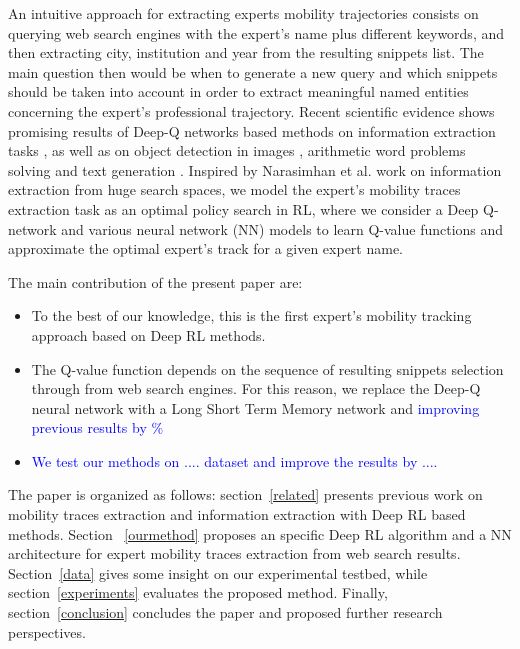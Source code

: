 \documentclass[11pt,a4paper]{article}
\newcommand{\PA}[1]{{\textcolor{blue}{#1}}}
\begin{document}
An intuitive approach for extracting experts mobility trajectories consists on querying web search engines with the expert's name plus different keywords, and then extracting city, institution and year from the resulting snippets list. The main question then would be when to generate a new query and which snippets should be taken into account in order to extract meaningful named entities concerning the expert's professional trajectory. Recent scientific evidence shows promising results of Deep-Q networks based methods on information extraction tasks \citep{narasimhan2016improving}, as well as on object detection in images \cite{Caicedo2015}, arithmetic word problems solving \cite{wang2018} and text generation \citep{Guo2015}. Inspired by Narasimhan et al.  work on information extraction from huge search spaces, we model the expert's mobility traces extraction task as an optimal policy search in RL, where we consider a Deep Q-network and various neural network (NN) models to learn Q-value functions and approximate the optimal expert's track for a given expert name.  

The main contribution of the present paper are:
\begin{itemize}
\item To the best of our knowledge, this is the first expert's mobility tracking approach based on  Deep RL methods. 
\item The Q-value function depends on the sequence of resulting snippets selection through from web search engines. For this reason, we replace the Deep-Q neural network \cite{mnih2015} with a Long Short Term Memory {\smallLSTM} network and \PA{improving previous results by \%  }
\item \PA{We test our methods on .... dataset and improve the results by .... }
\end{itemize}

The paper is organized as follows: section~\ref{related} presents previous work on mobility traces extraction and information extraction with Deep RL based methods. Section ~\ref{ourmethod} proposes an specific Deep RL algorithm and a NN architecture for expert mobility traces extraction from web search results. Section~\ref{data} gives some insight on our experimental testbed, while section~\ref{experiments} evaluates the proposed method. Finally, section~\ref{conclusion} concludes the paper and proposed further research perspectives.
\end{document}
